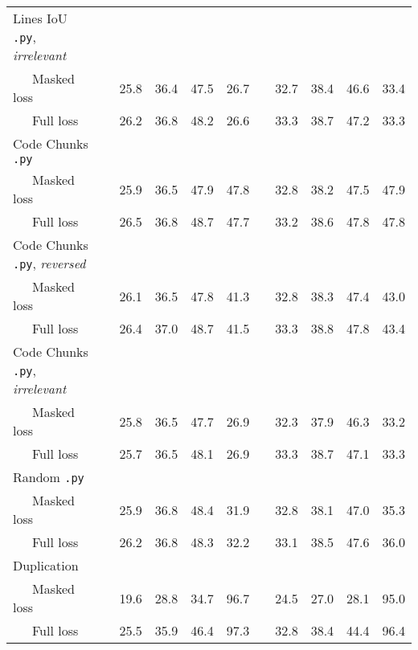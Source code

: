 \begin{table}[h]
{\begin{tabular}{lc cccc c cccc}
    \midrule
    Lines IoU \texttt{.py}, \textit{irrelevant} & & & & & & & & & & \\
    ~~~Masked loss & & 25.8 & 36.4 & 47.5 & 26.7 & & 32.7 & 38.4 & 46.6 & 33.4 \\
    ~~~Full loss & & 26.2 & 36.8 & 48.2 & 26.6 & & 33.3 & 38.7 & 47.2 & 33.3 \\
    
    \midrule
    Code Chunks \texttt{.py} & & & & & & & & & & \\
    ~~~Masked loss & & 25.9 & 36.5 & 47.9 & 47.8 & & 32.8 & 38.2 & 47.5 & 47.9 \\
    ~~~Full loss & & 26.5 & 36.8 & 48.7 & 47.7 & & 33.2 & 38.6 & 47.8 & 47.8 \\
    
    \midrule
    Code Chunks \texttt{.py}, \textit{reversed} & & & & & & & & & & \\
    ~~~Masked loss & & 26.1 & 36.5 & 47.8 & 41.3 & & 32.8 & 38.3 & 47.4 & 43.0 \\
    ~~~Full loss & & 26.4 & 37.0 & 48.7 & 41.5 & & 33.3 & 38.8 & 47.8 & 43.4 \\
    
    \midrule
    Code Chunks \texttt{.py}, \textit{irrelevant} & & & & & & & & & & \\
    ~~~Masked loss & & 25.8 & 36.5 & 47.7 & 26.9 & & 32.3 & 37.9 & 46.3 & 33.2 \\
    ~~~Full loss & & 25.7 & 36.5 & 48.1 & 26.9 & & 33.3 & 38.7 & 47.1 & 33.3 \\
    
    \midrule
    Random \texttt{.py} & & & & & & & & & & \\
    ~~~Masked loss & & 25.9 & 36.8 & 48.4 & 31.9 & & 32.8 & 38.1 & 47.0 & 35.3 \\
    ~~~Full loss & & 26.2 & 36.8 & 48.3 & 32.2 & & 33.1 & 38.5 & 47.6 & 36.0 \\
    
    \midrule
    Duplication & & & & & & & & & & \\
    ~~~Masked loss & & 19.6 & 28.8 & 34.7 & 96.7 & & 24.5 & 27.0 & 28.1 & 95.0 \\
    ~~~Full loss & & 25.5 & 35.9 & 46.4 & 97.3 & & 32.8 & 38.4 & 44.4 & 96.4 \\
    
    \bottomrule
    \end{tabular}
}
\end{table}